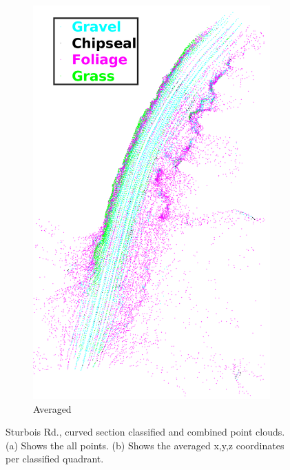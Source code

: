 \documentclass[numbered,pdftex]{ohio-etd}
\begin{document}
{\begin{figure}[H]
\begin{subfigure}{0.49\textwidth}
				\includegraphics[width = \textwidth]{Defense_Images/sturbois_curve_1_avg_classified.png}
				\caption{Averaged}
				\label{fig:Classified_PointCloud_1_AVG}
			\end{subfigure}
			\caption[Compiled Classified Point Cloud]{Sturbois Rd., curved section classified and combined point clouds. (a) Shows the all points. (b) Shows the averaged x,y,z coordinates per classified quadrant.}
			\label{fig:Combined_Classified_Clouds_1}
		\end{figure}
	
}
\end{document}

